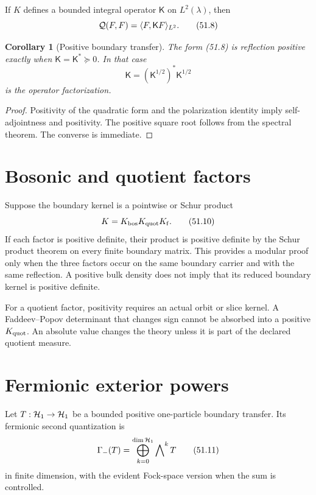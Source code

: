 \documentclass[11pt]{article}
\newtheorem{corollary}[theorem]{Corollary}
\theoremstyle{remark}
\begin{document}
If \(K\) defines a bounded integral operator
\({\mathsf K}\) on \(L^2(\lambda)\), then
\[
 {\cal Q}(F,F)=\langle F,{\mathsf K}F\rangle_{L^2}.      \tag{51.8}
\]

\begin{corollary}[Positive boundary transfer]
\label{cor:v15v51-operator}
The form (51.8) is reflection positive exactly when
\({\mathsf K}={\mathsf K}^*\succeq0\).  In that case
\[
 {\mathsf K}=({\mathsf K}^{1/2})^*{\mathsf K}^{1/2}     \tag{51.9}
\]
is the operator factorization.
\end{corollary}

\begin{proof}
Positivity of the quadratic form and the polarization identity imply
self-adjointness and positivity.  The positive square root follows
from the spectral theorem.  The converse is immediate.
\end{proof}

\section{Bosonic and quotient factors}

Suppose the boundary kernel is a pointwise or Schur product
\[
 K=K_{\rm bos}K_{\rm quot}K_{\rm f}.                    \tag{51.10}
\]
If each factor is positive definite, their product is positive
definite by the Schur product theorem on every finite boundary
matrix.  This provides a modular proof only when the three factors
occur on the same boundary carrier and with the same reflection.
A positive bulk density does not imply that its reduced boundary
kernel is positive definite.

For a quotient factor, positivity requires an actual orbit or slice
kernel.  A Faddeev--Popov determinant that changes sign cannot be
absorbed into a positive \(K_{\rm quot}\).  An absolute value changes
the theory unless it is part of the declared quotient measure.

\section{Fermionic exterior powers}

Let \(T:{\cal H}_1\to{\cal H}_1\) be a bounded positive one-particle
boundary transfer.  Its fermionic second quantization is
\[
 \Gamma_-(T)=
 \bigoplus_{k=0}^{\dim{\cal H}_1}\bigwedge\nolimits^kT   \tag{51.11}
\]
in finite dimension, with the evident Fock-space version when the
sum is controlled.
\end{document}
